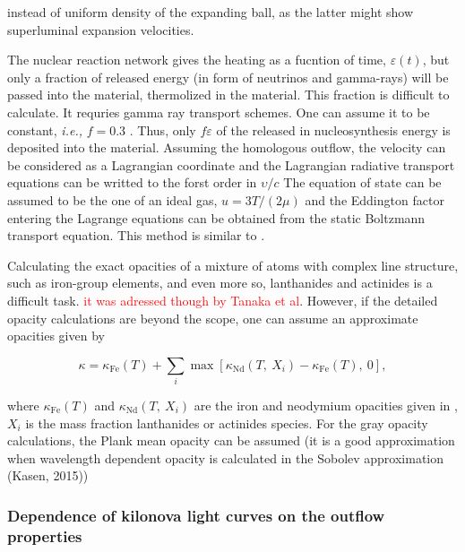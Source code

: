 \documentclass[11pt,a4paper,headinclude=true,DIV=14,BCOR=8mm,chapterprefix,listof=totoc,twoside,openright,abstracton]{scrbook}
\newcommand{\red}[1]{\textcolor{red}{#1}}
\begin{document}
instead of uniform density of the expanding ball, as the latter might show superluminal expansion velocities.

The nuclear reaction network gives the heating as a fucntion of time, $\varepsilon(t)$, but only a fraction of released energy (in form of neutrinos and gamma-rays) will be passed into the material, thermolized in the material. This fraction is difficult to calculate. It requries gamma ray transport schemes. One can assume it to be constant, \textit{i.e.,} $f=0.3$ \cite{Barnes and Kasen, 2013}. Thus, only $f\varepsilon$ of the released in nucleosynthesis energy is deposited into the material.
Assuming the homologous outflow, the velocity can be considered as a Lagrangian coordinate and the Lagrangian radiative transport equations can be writted to the forst order in $\upsilon/c$ \cite{Mihalas and Weibel-Mihalas, 1999}
The equation of state can be assumed to be the one of an ideal gas, $u=3T/(2\mu)$ and the Eddington factor entering the Lagrange equations can be obtained from the static Boltzmann transport equation. 
This method is similar to \cite{Ensman, 1994}. 

Calculating the exact opacities of a mixture of atoms with complex line structure, such as iron-group elements, and even more so, lanthanides and actinides is a difficult task. \red{it was adressed though by Tanaka et al}.
However, if the detailed opacity calculations are beyond the scope, one can assume an approximate opacities given by 

\begin{equation}
    \kappa = \kappa_{\text{Fe}}(T) + \sum_i \max[\kappa_{\text{Nd}}(T,\: X_i) - \kappa_{\text{Fe}}(T),\: 0],
\end{equation}

where $\kappa_{\text{Fe}}(T)$ and $\kappa_{\text{Nd}}(T,\: X_i)$ are the iron and neodymium opacities given in \cite{Kasen et al., 2013}, $X_i$ is the mass fraction lanthanides or actinides species. 
For the gray opacity calculations, the Plank mean opacity can be assumed (it is a good approximation when wavelength dependent opacity is calculated in the Sobolev approximation (Kasen, 2015))


\subsubsection{Dependence of kilonova light curves on the outflow properties}
\end{document}
